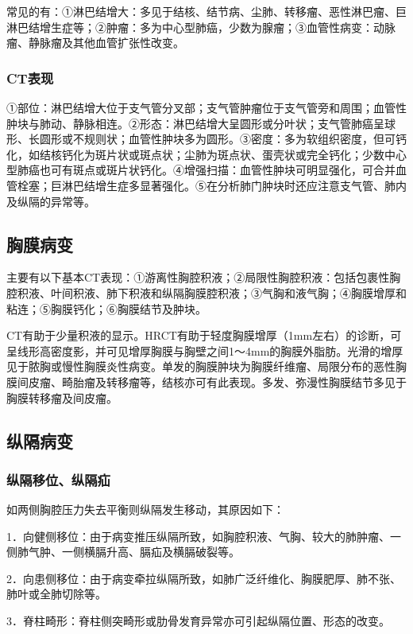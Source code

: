 常见的有：①淋巴结增大：多见于结核、结节病、尘肺、转移瘤、恶性淋巴瘤、巨淋巴结增生症等；②肿瘤：多为中心型肺癌，少数为腺瘤；③血管性病变：动脉瘤、静脉瘤及其他血管扩张性改变。

\subsubsection{CT表现}

①部位：淋巴结增大位于支气管分叉部；支气管肿瘤位于支气管旁和周围；血管性肿块与肺动、静脉相连。②形态：淋巴结增大呈圆形或分叶状；支气管肺癌呈球形、长圆形或不规则状；血管性肿块多为圆形。③密度：多为软组织密度，但可钙化，如结核钙化为斑片状或斑点状；尘肺为斑点状、蛋壳状或完全钙化；少数中心型肺癌也可有斑点或斑片状钙化。④增强扫描：血管性肿块可明显强化，可合并血管栓塞；巨淋巴结增生症多显著强化。⑤在分析肺门肿块时还应注意支气管、肺内及纵隔的异常等。

\subsection{胸膜病变}

主要有以下基本CT表现：①游离性胸腔积液；②局限性胸腔积液：包括包裹性胸腔积液、叶间积液、肺下积液和纵隔胸膜腔积液；③气胸和液气胸；④胸膜增厚和粘连；⑤胸膜钙化；⑥胸膜结节及肿块。

CT有助于少量积液的显示。HRCT有助于轻度胸膜增厚（1mm左右）的诊断，可呈线形高密度影，并可见增厚胸膜与胸壁之间1～4mm的胸膜外脂肪。光滑的增厚见于脓胸或慢性胸膜炎性病变。单发的胸膜肿块为胸膜纤维瘤、局限分布的恶性胸膜间皮瘤、畸胎瘤及转移瘤等，结核亦可有此表现。多发、弥漫性胸膜结节多见于胸膜转移瘤及间皮瘤。

\subsection{纵隔病变}

\subsubsection{纵隔移位、纵隔疝}

如两侧胸腔压力失去平衡则纵隔发生移动，其原因如下：

1．向健侧移位：由于病变推压纵隔所致，如胸腔积液、气胸、较大的肺肿瘤、一侧肺气肿、一侧横膈升高、膈疝及横膈破裂等。

2．向患侧移位：由于病变牵拉纵隔所致，如肺广泛纤维化、胸膜肥厚、肺不张、肺叶或全肺切除等。

3．脊柱畸形：脊柱侧突畸形或肋骨发育异常亦可引起纵隔位置、形态的改变。

